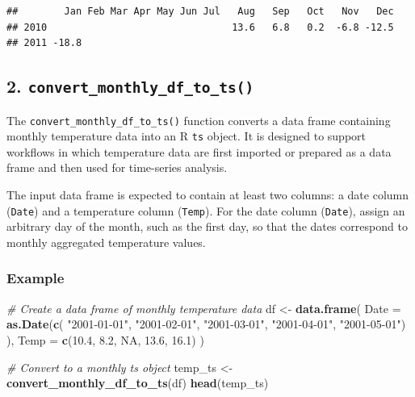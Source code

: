 \documentclass[
]{article}
\newenvironment{Shaded}{\begin{snugshade}}{\end{snugshade}}
\newcommand{\AttributeTok}[1]{\textcolor[rgb]{0.13,0.29,0.53}{#1}}
\newcommand{\CommentTok}[1]{\textcolor[rgb]{0.56,0.35,0.01}{\textit{#1}}}
\newcommand{\ConstantTok}[1]{\textcolor[rgb]{0.56,0.35,0.01}{#1}}
\newcommand{\FloatTok}[1]{\textcolor[rgb]{0.00,0.00,0.81}{#1}}
\newcommand{\FunctionTok}[1]{\textcolor[rgb]{0.13,0.29,0.53}{\textbf{#1}}}
\newcommand{\NormalTok}[1]{#1}
\newcommand{\OtherTok}[1]{\textcolor[rgb]{0.56,0.35,0.01}{#1}}
\newcommand{\StringTok}[1]{\textcolor[rgb]{0.31,0.60,0.02}{#1}}
\begin{document}
\begin{verbatim}
##        Jan Feb Mar Apr May Jun Jul   Aug   Sep   Oct   Nov   Dec
## 2010                                13.6   6.8   0.2  -6.8 -12.5
## 2011 -18.8
\end{verbatim}

\subsection{\texorpdfstring{2.
\texttt{convert\_monthly\_df\_to\_ts()}}{2. convert\_monthly\_df\_to\_ts()}}\label{convert_monthly_df_to_ts}

The \texttt{convert\_monthly\_df\_to\_ts()} function converts a data
frame containing monthly temperature data into an R \texttt{ts} object.
It is designed to support workflows in which temperature data are first
imported or prepared as a data frame and then used for time-series
analysis.

The input data frame is expected to contain at least two columns: a date
column (\texttt{Date}) and a temperature column (\texttt{Temp}). For the
date column (\texttt{Date}), assign an arbitrary day of the month, such
as the first day, so that the dates correspond to monthly aggregated
temperature values.

\subsubsection{Example}\label{example-1}

\begin{Shaded}
\begin{Highlighting}[]
\CommentTok{\# Create a data frame of monthly temperature data}
\NormalTok{df }\OtherTok{\textless{}{-}} \FunctionTok{data.frame}\NormalTok{(}
  \AttributeTok{Date =} \FunctionTok{as.Date}\NormalTok{(}\FunctionTok{c}\NormalTok{(}
    \StringTok{"2001{-}01{-}01"}\NormalTok{,}
    \StringTok{"2001{-}02{-}01"}\NormalTok{,}
    \StringTok{"2001{-}03{-}01"}\NormalTok{,}
    \StringTok{"2001{-}04{-}01"}\NormalTok{,}
    \StringTok{"2001{-}05{-}01"}\NormalTok{)}
\NormalTok{    ),}
  \AttributeTok{Temp =} \FunctionTok{c}\NormalTok{(}\FloatTok{10.4}\NormalTok{, }\FloatTok{8.2}\NormalTok{, }\ConstantTok{NA}\NormalTok{, }\FloatTok{13.6}\NormalTok{, }\FloatTok{16.1}\NormalTok{)}
\NormalTok{  )}

\CommentTok{\# Convert to a monthly ts object}
\NormalTok{temp\_ts }\OtherTok{\textless{}{-}} \FunctionTok{convert\_monthly\_df\_to\_ts}\NormalTok{(df)}
\FunctionTok{head}\NormalTok{(temp\_ts)}
\end{Highlighting}
\end{Shaded}
\end{document}
